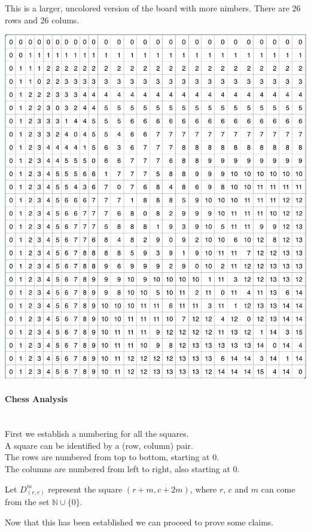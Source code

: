 \documentclass{article}
\newcommand{\N}{\mathbb{N}}
\newcommand{\D}[2]{D_{#1}^{#2}}
\begin{document}
This is a larger, uncolored version of the board with more nimbers. There are
26 rows and 26 colums.
\begin{center}
  \includegraphics[scale=0.5]{expandedchessboard}
\end{center}
\newpage

\paragraph{Chess Analysis}\mbox{}\\
First we establish a numbering for all the squares. \\
A square can be identified by a (row, column) pair. \\
The rows are numbered from top to bottom, starting at $0$. \\
The columns are numbered from left to right, also starting at $0$.
\medskip

Let $\D{(r,c)}{m}$ represent the square $(r + m, c + 2m)$, where
$r$, $c$ and $m$ can come from the set $\N \cup \{0\}$.
\medskip

Now that this has been established we can proceed to prove
some claims.
\end{document}
